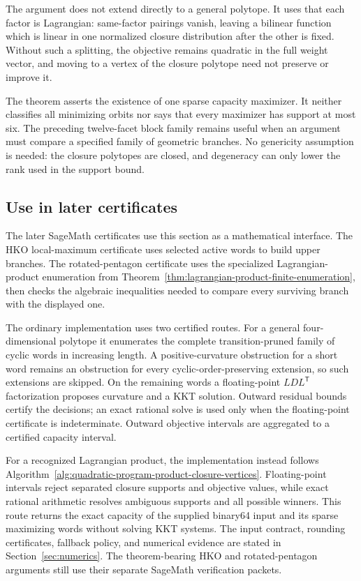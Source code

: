 \begin{remark}
The argument does not extend directly to a general polytope.  It uses that
each factor is Lagrangian: same-factor pairings vanish, leaving a bilinear
function which is linear in one normalized closure distribution after the
other is fixed.  Without such a splitting, the objective remains quadratic in
the full weight vector, and moving to a vertex of the closure polytope need not
preserve or improve it.

The theorem asserts the existence of one sparse capacity maximizer.  It neither
classifies all minimizing orbits nor says that every maximizer has support at
most six.  The preceding twelve-facet block family remains useful when an
argument must compare a specified family of geometric branches.  No
genericity assumption is needed: the closure polytopes are closed, and
degeneracy can only lower the rank used in the support bound.
\end{remark}

\subsection{Use in later certificates}
\label{subsec:quadratic-program-algorithm-hk2019-implementation-status}

The later SageMath certificates use this section as a mathematical interface.
The HKO local-maximum certificate uses selected active words to build upper
branches. The rotated-pentagon certificate uses the specialized
Lagrangian-product enumeration from
Theorem~\ref{thm:lagrangian-product-finite-enumeration}, then checks the
algebraic inequalities needed to compare every surviving branch with the
displayed one.

The ordinary implementation uses two certified routes.  For a general
four-dimensional polytope it enumerates the complete transition-pruned family
of cyclic words in increasing length.  A positive-curvature obstruction for a
short word remains an obstruction for every cyclic-order-preserving extension,
so such extensions are skipped.  On the remaining words a floating-point
\(LDL^\mathsf{T}\) factorization proposes curvature and a KKT solution.
Outward residual bounds certify the decisions; an exact rational solve is used
only when the floating-point certificate is indeterminate.  Outward objective
intervals are aggregated to a certified capacity interval.

For a recognized Lagrangian product, the implementation instead follows
Algorithm~\ref{alg:quadratic-program-product-closure-vertices}.  Floating-point
intervals reject separated closure supports and objective values, while exact
rational arithmetic resolves ambiguous supports and all possible winners.
This route returns the exact capacity of the supplied binary64 input and its
sparse maximizing words without solving KKT systems.  The input contract,
rounding certificates, fallback policy, and numerical evidence are stated in
Section~\ref{sec:numerics}.  The theorem-bearing HKO and rotated-pentagon
arguments still use their separate SageMath verification packets.

